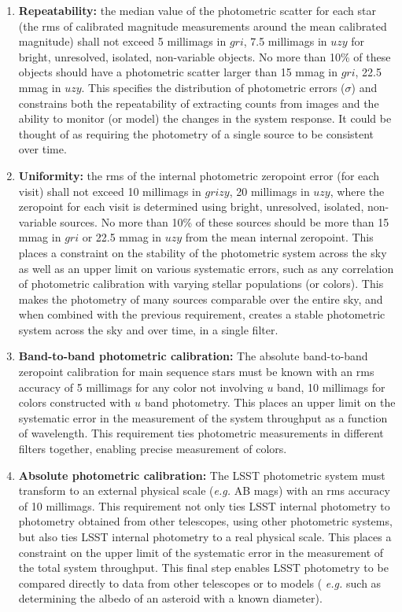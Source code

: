 \documentclass[12pt,preprint]{aastex}
\begin{document}
\begin{enumerate}
\item{{\bf Repeatability:} the median value of the photometric scatter
for each star (the rms of calibrated magnitude measurements around the
mean calibrated magnitude) shall not exceed 5 millimags in $gri$, 7.5
millimags in $uzy$ for bright, unresolved, isolated, non-variable
objects. No more than 10\% of these objects should have a photometric
scatter larger than 15 mmag in $gri$, 22.5 mmag in $uzy$.  This
specifies the distribution of photometric errors ($\sigma$) and
constrains both the repeatability of extracting counts from images and
the ability to monitor (or model) the changes in the system
response. It could be thought of as requiring the photometry
of a single source to be consistent over
time. \label{repeatability_req}}
\item{{\bf Uniformity:} the rms of the internal photometric zeropoint
error (for each visit) shall not exceed 10 millimags in $grizy$, 20 millimags in $uzy$,
where the zeropoint for each visit is determined using bright, unresolved, isolated, non-variable
sources. No more than 10\% of these sources should be more than 15
mmag in $gri$ or 22.5 mmag in $uzy$ from the mean internal zeropoint.
This places a constraint on the stability of the photometric system
across the sky as well as an upper limit on various systematic
errors, such as any correlation of photometric calibration with
varying stellar populations (or colors). This makes the photometry of
many sources comparable over the entire sky, and when combined with
the previous requirement, creates a stable photometric system across
the sky and over time, in a single filter. \label{uniformity_req}}
\item{{\bf Band-to-band photometric calibration:} The absolute
band-to-band zeropoint calibration for main sequence stars must be
known with an rms accuracy of 5 millimags for any color not involving $u$
band, 10 millimags for colors constructed with $u$ band
photometry. This places an upper limit on the systematic error in
the measurement of the system throughput as a function of
wavelength. This requirement ties photometric measurements in
different filters together, enabling precise measurement of colors. 
\label{color_req}}
\item{{\bf Absolute photometric calibration:} The LSST photometric
system must transform to an external physical scale ({\it e.g.} AB
mags) with an rms accuracy of 10 millimags. This requirement not only
ties LSST internal photometry to photometry obtained from other
telescopes, using other photometric systems, but also ties LSST
internal photometry to a real physical scale. This places a constraint
on the upper limit of the systematic error in the measurement of the
total system throughput. This final step enables LSST photometry to be
compared directly to data from other telescopes or to models ({\it
e.g.} such as determining the albedo of an asteroid with a known
diameter). \label{abs_req}}
\end{enumerate}
\end{document}
